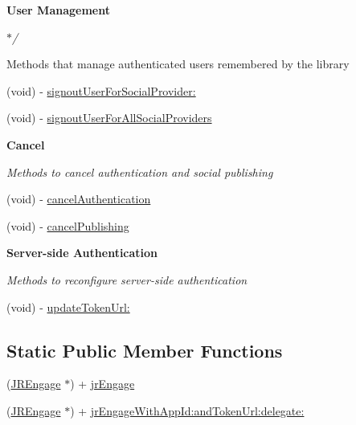 \begin{Indent}{\bf User Management}\par
{\em \label{_amgrp92726ab5faeb2cb9208eaac9af0346bd}
$\ast$/

Methods that manage authenticated users remembered by the library }\begin{DoxyCompactItemize}
\item 
(void) -\/ \hyperlink{interface_j_r_engage_aede9ed92d80f14d85e59a982da3150fc}{signoutUserForSocialProvider:}
\item 
(void) -\/ \hyperlink{interface_j_r_engage_a1f4e27ed5dbc05892fd7bc2255d2afa8}{signoutUserForAllSocialProviders}
\end{DoxyCompactItemize}
\end{Indent}
\begin{Indent}{\bf Cancel}\par
{\em \label{_amgrpea4788705e6873b424c65e91c2846b19}
 Methods to cancel authentication and social publishing }\begin{DoxyCompactItemize}
\item 
(void) -\/ \hyperlink{interface_j_r_engage_a17b67c9bb98230fb7d59f8c35a20662b}{cancelAuthentication}
\item 
(void) -\/ \hyperlink{interface_j_r_engage_a205c368338061976178a5b0e36f2d4f2}{cancelPublishing}
\end{DoxyCompactItemize}
\end{Indent}
\begin{Indent}{\bf Server-\/side Authentication}\par
{\em \label{_amgrp1fc6cae7bdf84f91a0bad45f5891f15e}
 Methods to reconfigure server-\/side authentication }\begin{DoxyCompactItemize}
\item 
(void) -\/ \hyperlink{interface_j_r_engage_ac0fb45ee43767dfdea0057bb93000db6}{updateTokenUrl:}
\end{DoxyCompactItemize}
\end{Indent}
\subsection*{Static Public Member Functions}
\begin{DoxyCompactItemize}
\item 
(\hyperlink{interface_j_r_engage}{JREngage} $\ast$) + \hyperlink{interface_j_r_engage_adb6bf3a6869d83f2bfce0783f128d9e6}{jrEngage}
\item 
(\hyperlink{interface_j_r_engage}{JREngage} $\ast$) + \hyperlink{interface_j_r_engage_a36c199d6384893b1bf42712771af1e8b}{jrEngageWithAppId:andTokenUrl:delegate:}
\end{DoxyCompactItemize}


